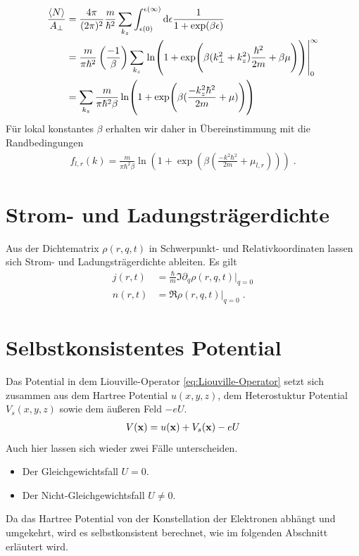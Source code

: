 \begin{align}
  \frac{\expval{N}}{A_{\perp}} &= \frac{4\pi}{(2\pi)^2} \frac{m}{\hbar^2} \sum_{k_z} \int_{\epsilon(0)}^{{\epsilon(\infty)}} \mathop{}\!\mathrm{d} \epsilon \frac{1}{1+\exp(\beta\epsilon)} \\
    &= \frac{m}{\pi\hbar^2}\left( \frac{-1}{\beta}\right) \sum_{k_z} \left.\ln(1+\exp(\beta(k_{\perp}^2 + k_z^2)\frac{\hbar^2}{2m} + \beta\mu))\right|_0^{\infty} \\
    &= \sum_{k_z} \frac{m}{\pi\hbar^2\beta} \ln(1+\exp(\beta(\frac{- k_z^2\hbar^2}{2m} + \mu)))
\end{align}
Für lokal konstantes $\beta$ erhalten wir daher in Übereinstimmung mit \cite{frensley2} die Randbedingungen
\begin{align}
  f_{l,r} (k) = \frac{m}{\pi\hbar^2\beta} \ln(1+\exp(\beta(\frac{- k^2\hbar^2}{2m} + \mu_{l,r}))) \; .
\end{align}


\section{Strom- und Ladungsträgerdichte}
Aus der Dichtematrix $\rho(r,q,t)$ in Schwerpunkt- und Relativkoordinaten lassen sich Strom- und Ladungsträgerdichte ableiten. Es gilt \cite{lukas1}
\begin{align}
  j(r,t) &= \frac{\hbar}{m}\Im{\partial_q \rho(r,q,t)|_{q=0}} \\
  n(r,t) &= \Re{\rho(r,q,t)|_{q=0}} \; .
  \label{eq:dichte}
\end{align}

\section{Selbstkonsistentes Potential}
Das Potential in dem Liouville-Operator \eqref{eq:Liouville-Operator} setzt sich zusammen aus dem Hartree Potential $u(x,y,z)$, dem Heterostuktur Potential $V_s(x,y,z)$ sowie dem äußeren Feld $-eU$.
\begin{align}
  V(\vb{x}) = u(\vb{x}) + V_s(\vb{x}) - eU
\end{align}
Auch hier lassen sich wieder zwei Fälle unterscheiden.
\begin{itemize}
  \item Der Gleichgewichtsfall $U=0$. %
  \item Der Nicht-Gleichgewichtsfall $U\neq 0$. %
\end{itemize}
Da das Hartree Potential von der Konstellation der Elektronen abhängt und umgekehrt, wird es selbstkonsistent berechnet, wie im folgenden Abschnitt erläutert wird.

